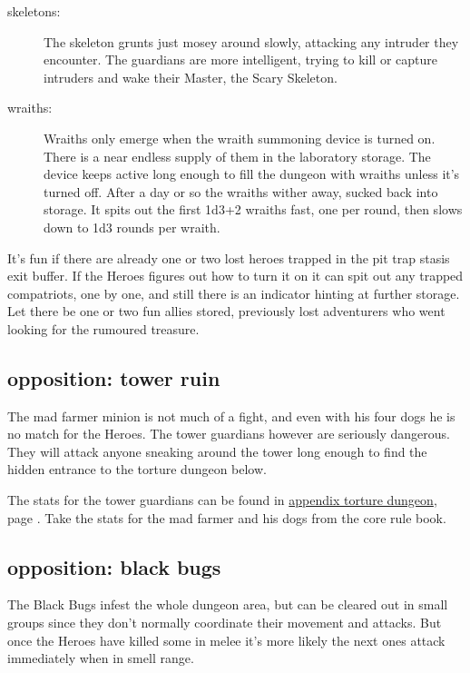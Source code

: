 \begin{description}
\item[skeletons:] The skeleton grunts just mosey around slowly, attacking any intruder they encounter. The guardians are more intelligent, trying to kill or capture intruders and wake their Master, the Scary Skeleton.

\item[wraiths:] Wraiths only emerge when the wraith summoning device is turned on. There is a near endless supply of them in the laboratory storage. The device keeps active long enough to fill the dungeon with wraiths unless it's turned off. After a day or so the wraiths wither away, sucked back into storage. It spits out the first 1d3+2 wraiths fast, one per round, then slows down to 1d3 rounds per wraith.

\end{description}

It's fun if there are already one or two lost heroes trapped in the pit trap stasis exit buffer. If the Heroes figures out how to turn it on it can spit out any trapped compatriots, one by one, and still there is an indicator hinting at further storage. Let there be one or two fun allies stored, previously lost adventurers who went looking for the rumoured treasure.


\subsection*{opposition: tower ruin}

The mad farmer minion is not much of a fight, and even with his four dogs he is no match for the Heroes. The tower guardians however are seriously dangerous. They will attack anyone sneaking around the tower long enough to find the hidden entrance to the torture dungeon below.

The stats for the tower guardians can be found in \hyperref[appendixtorturedungeon]{appendix torture dungeon}, page \pageref{appendixtorturedungeon}. Take the stats for the mad farmer and his dogs from the core rule book.


\subsection*{opposition: black bugs}

The Black Bugs infest the whole dungeon area, but can be cleared out in small groups since they don't normally coordinate their movement and attacks. But once the Heroes have killed some in melee it's more likely the next ones attack immediately when in smell range.


